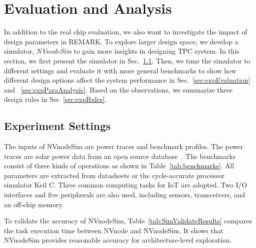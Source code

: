 \vspace{-0pt}
\section{Evaluation and Analysis} \label{sec:evaluation}
\vspace{-5pt}
%
In addition to the real chip evaluation, we also want to investigate the impact of design parameters in REMARK.
To explore larger design space, we develop a simulator, \emph{NVnodeSim} to gain more insights in designing TPC system.
In this section, we first present the simulator in Sec.~\ref{sec:expSettings}. 
Then, we tune the simulator to different settings and evaluate it with more general benchmarks to show how different design options affect the system performance in Sec.~\ref{sec:expEvaluation} and ~\ref{sec:expParaAnalysis}. 
Based on the observations, we summarize three design rules in Sec~\ref{sec:expRules}. 

\subsection{Experiment Settings} \label{sec:expSettings}
\vspace{-5pt}
The inputs of NVnodeSim are power traces and benchmark profiles.
The power traces are solar power data from an open source database~\cite{midc2015solar}.
The benchmarks consist of three kinds of operations as shown in Table~\ref{tab:benchmarks}.
All parameters are extracted from datasheets or the cycle-accurate processor simulator Keil C.
Three common computing tasks for IoT are adopted.
Two I/O interfaces and five peripherals are also used, including sensors, transceivers, and an off-chip memory.



%
To validate the accuracy of NVnodeSim, Table~\ref{tab:SimValidateResults} compares the task execution time between NVnode and NVnodeSim.
It shows that NVnodeSim provides reasonable accuracy for architecture-level exploration.



